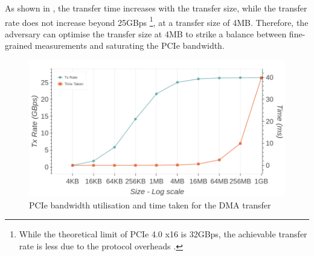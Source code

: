 As shown in , the transfer time increases with the transfer size, while the transfer rate does not increase beyond 25GBps
\footnote{While the theoretical limit of PCIe 4.0 x16 is 32GBps, the achievable transfer rate is less due to the protocol overheads \cite{neugebauer2018understanding}.},
at a transfer size of 4MB.
Therefore, the adversary can optimise the transfer size at 4MB to strike a balance between fine-grained measurements and saturating the PCIe bandwidth.

\begin{figure}[!htb]
    \centering
    \includegraphics[width=\columnwidth]{figures/interconnect-sc/dma/bw_util_and_time_per_size.png}
    \caption{PCIe bandwidth utilisation and time taken for the DMA transfer}
    \label{fig:bw-util-and-time-per-size}
\end{figure}
